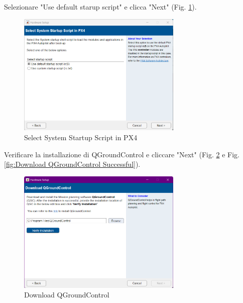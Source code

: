 \noindent
Selezionare "Use default starup script" e clicca "Next" (Fig. \ref{fig:Select System Startup Script in PX4}).
\begin{figure}[H] %
  \centering
  \includegraphics[width=0.7\textwidth]{files/images/matlab9.png} %
  \caption{Select System Startup Script in PX4} %
  \label{fig:Select System Startup Script in PX4} %
\end{figure}
\noindent
Verificare la installazione di QGroundControl e cliccare "Next" (Fig. \ref{fig:Download QGroundControl} e Fig. \ref{fig:Download QGroundControl Successful}).
\begin{figure}[H] %
  \centering
  \includegraphics[width=0.7\textwidth]{files/images/matlab10.png} %
  \caption{Download QGroundControl} %
  \label{fig:Download QGroundControl} %
\end{figure}
\noindent
